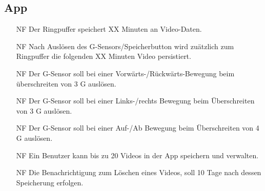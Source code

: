 \subsection{App}
\begin{itemize}
\item[NF] Der Ringpuffer speichert XX Minuten an Video-Daten.

\item[NF] Nach Auslösen des G-Sensors/Speicherbutton wird zuätzlich zum Ringpuffer die folgenden XX Minuten Video persistiert.

\item[NF] Der G-Sensor soll bei einer Vorwärts-/Rückwärts-Bewegung beim überschreiten von 3 G auslösen.

\item[NF] Der G-Sensor soll bei einer Links-/rechts Bewegung beim Überschreiten von 3 G auslösen.

\item[NF] Der G-Sensor soll bei einer Auf-/Ab Bewegung beim Überschreiten von 4 G auslösen.

\item[NF] Ein Benutzer kann bis zu 20 Videos in der App speichern und verwalten.

\item[NF] Die Benachrichtigung zum Löschen eines Videos, soll 10 Tage nach dessen Speicherung erfolgen.
\end{itemize}

